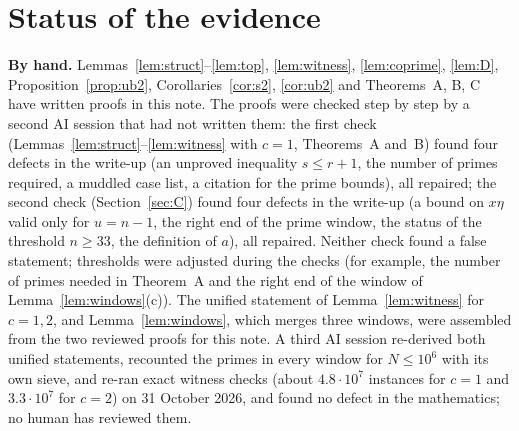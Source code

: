 \documentclass[11pt]{article}
\theoremstyle{remark}
\begin{document}
\section{Status of the evidence}\label{sec:status}

\textbf{By hand.} Lemmas~\ref{lem:struct}--\ref{lem:top}, \ref{lem:witness}, \ref{lem:coprime}, \ref{lem:D}, Proposition~\ref{prop:ub2}, Corollaries~\ref{cor:s2}, \ref{cor:ub2} and Theorems~A, B, C have written proofs in this note. The proofs were checked step by step by a second AI session that had not written them: the first check (Lemmas~\ref{lem:struct}--\ref{lem:witness} with $c=1$, Theorems~A and~B) found four defects in the write-up (an unproved inequality $s\le r+1$, the number of primes required, a muddled case list, a citation for the prime bounds), all repaired; the second check (Section~\ref{sec:C}) found four defects in the write-up (a bound on $x\eta$ valid only for $u=n-1$, the right end of the prime window, the status of the threshold $n\ge33$, the definition of $a$), all repaired. Neither check found a false statement; thresholds were adjusted during the checks (for example, the number of primes needed in Theorem~A and the right end of the window of Lemma~\ref{lem:windows}(c)). The unified statement of Lemma~\ref{lem:witness} for $c=1,2$, and Lemma~\ref{lem:windows}, which merges three windows, were assembled from the two reviewed proofs for this note. A third AI session re-derived both unified statements, recounted the primes in every window for $N\le10^6$ with its own sieve, and re-ran exact witness checks (about $4.8\cdot10^7$ instances for $c=1$ and $3.3\cdot10^7$ for $c=2$) on 31 October 2026, and found no defect in the mathematics; no human has reviewed them.
\end{document}
